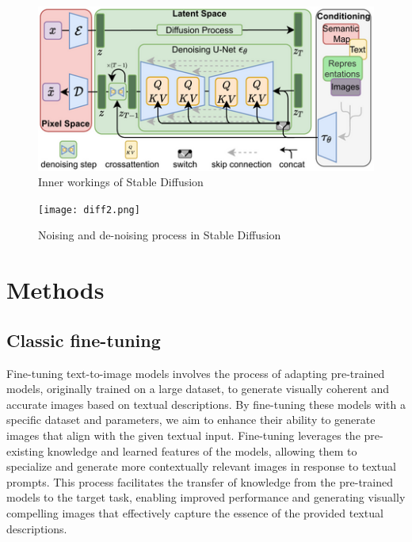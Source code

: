 \documentclass[conference]{IEEEtran}
\begin{document}
\begin{figure}
\centerline{\includegraphics[scale=1.8]{diff.png}}
\caption{Inner workings of Stable Diffusion}
\label{fig1}
\end{figure}

\begin{figure}
\centerline{\texttt{[image: diff2.png]}}
\caption{Noising and de-noising process in Stable Diffusion}
\label{fig2}
\end{figure}

\section{Methods}

\subsection{Classic fine-tuning}
Fine-tuning text-to-image models involves the process of adapting pre-trained models, originally trained on a large dataset, to generate visually coherent and accurate images based on textual descriptions. By fine-tuning these models with a specific dataset and parameters, we aim to enhance their ability to generate images that align with the given textual input. Fine-tuning leverages the pre-existing knowledge and learned features of the models, allowing them to specialize and generate more contextually relevant images in response to textual prompts. This process facilitates the transfer of knowledge from the pre-trained models to the target task, enabling improved performance and generating visually compelling images that effectively capture the essence of the provided textual descriptions.
\end{document}
